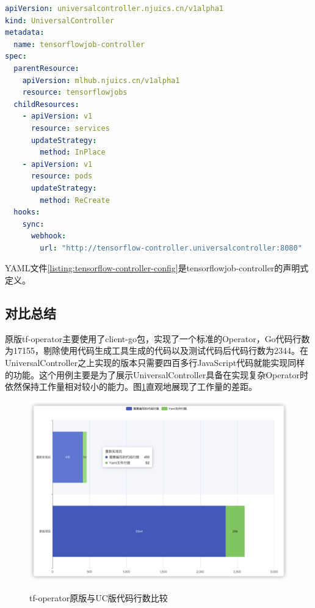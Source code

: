 \documentclass[macfonts,master]{njuthesis}
\begin{document}
\begin{lstlisting}[language=yaml,caption=tensorflowjob-controller的配置文件,label=listing:tensorflow-controller-config]
apiVersion: universalcontroller.njuics.cn/v1alpha1
kind: UniversalController
metadata:
  name: tensorflowjob-controller
spec:
  parentResource:
    apiVersion: mlhub.njuics.cn/v1alpha1
    resource: tensorflowjobs
  childResources:
    - apiVersion: v1
      resource: services
      updateStrategy:
        method: InPlace
    - apiVersion: v1
      resource: pods
      updateStrategy:
        method: ReCreate
  hooks:
    sync:
      webhook:
        url: "http://tensorflow-controller.universalcontroller:8080"
\end{lstlisting}

YAML文件\ref{listing:tensorflow-controller-config}是tensorflowjob-controller的声明式定义。

\subsection{对比总结}
原版tf-operator主要使用了client-go包，实现了一个标准的Operator，Go代码行数为17155，剔除使用代码生成工具生成的代码以及测试代码后代码行数为2344。在UniversalController之上实现的版本只需要四百多行JavaScript代码就能实现同样的功能。这个用例主要是为了展示UniversalController具备在实现复杂Operator时依然保持工作量相对较小的能力。图\ref{fig:tf-operator-cl}直观地展现了工作量的差距。

\begin{figure}[htbp]
  \centering
  \includegraphics[width= 1\textwidth]{pics/tf-operator-cl.png}\\
  \caption{tf-operator原版与UC版代码行数比较}\label{fig:tf-operator-cl}
\end{figure}
\end{document}
